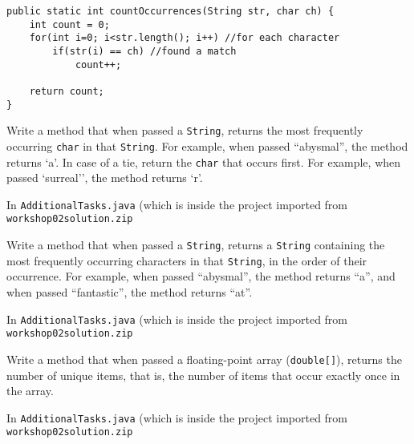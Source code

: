 \begin{questions}
\begin{solution}
\begin{lstlisting}
public static int countOccurrences(String str, char ch) {
	int count = 0;
	for(int i=0; i<str.length(); i++) //for each character
		if(str(i) == ch) //found a match
			count++;
	
	return count;
}
\end{lstlisting}
\end{solution}

\question Write a method that when passed a \texttt{String}, returns the most frequently occurring \texttt{char} in that \texttt{String}. For example, when passed ``abysmal'', the method returns `a'. In case of a tie, return the \texttt{char} that occurs first. For example, when passed `surreal'', the method returns `r'.

\begin{solution}
In \texttt{AdditionalTasks.java} (which is inside the project imported from \texttt{workshop02solution.zip}
\end{solution}

\question Write a method that when passed a \texttt{String}, returns a \texttt{String} containing the most frequently occurring characters in that \texttt{String}, in the order of their occurrence. For example, when passed ``abysmal'', the method returns ``a'', and when passed ``fantastic'', the method returns ``at''.

\begin{solution}
In \texttt{AdditionalTasks.java} (which is inside the project imported from \texttt{workshop02solution.zip}
\end{solution}

\question Write a method that when passed a floating-point array (\texttt{double[]}), returns the number of unique items, that is, the number of items that occur exactly once in the array.

\begin{solution}
In \texttt{AdditionalTasks.java} (which is inside the project imported from \texttt{workshop02solution.zip}
\end{solution}
\end{questions}

